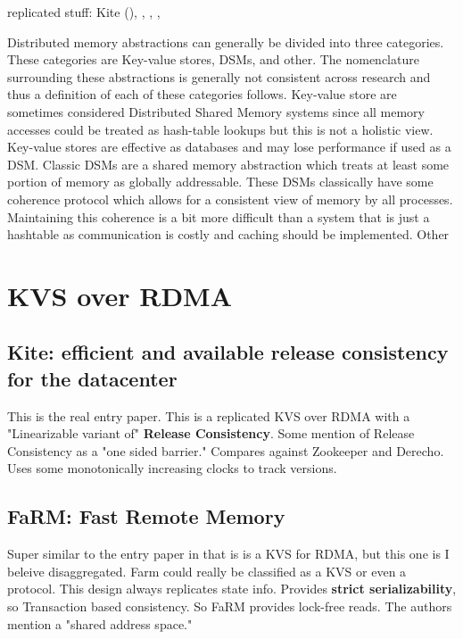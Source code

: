 \documentclass[sigplan,nonacm]{acmart}
\begin{document}
replicated stuff:
Kite (\cite{Gavrielatos-PPoPP-2020}), \cite{Alquraan-NSDI-2024}, \cite{Katsarakis-ASPLOS-2020}, 
\cite{Gavrielatos-EuroSys-2021}, \cite{Houshmand-PLDI-2022}

Distributed memory abstractions can generally be divided into three categories.
These categories are Key-value stores, DSMs, and other. The nomenclature surrounding 
these abstractions is generally not consistent across research and thus a definition of each 
of these categories follows. Key-value store are sometimes considered Distributed Shared Memory systems
since all memory accesses could be treated as hash-table lookups but this is not a holistic view. Key-value
stores are effective as databases and may lose performance if used as a DSM. Classic DSMs are a shared
memory abstraction which treats at least some portion of memory as globally addressable. These DSMs 
classically have some coherence protocol which allows for a consistent view of memory by all processes.
Maintaining this coherence is a bit more difficult than a system that is just a hashtable as communication is 
costly and caching should be implemented. Other 


\section{KVS over RDMA}

    \subsection{Kite: efficient and available release consistency for the datacenter}
    This is the real entry paper. This is a replicated KVS over RDMA with a 
    "Linearizable variant of" \textbf{Release Consistency}. Some mention of Release Consistency
    as a "one sided barrier." Compares against Zookeeper and Derecho. Uses some 
    monotonically increasing clocks to track versions.\cite{Gavrielatos-PPoPP-2020} 

    \subsection{FaRM: Fast Remote Memory}
    Super similar to the entry paper in that is is a KVS for RDMA, but this one is I beleive disaggregated. 
    Farm could really be classified as a KVS or even a protocol. This design always replicates state info. 
    Provides \textbf{strict serializability}, so Transaction based consistency.
    So FaRM provides lock-free reads. The authors mention
    a "shared address space." \cite{Dragojevic-NSDI-2014}
\end{document}
